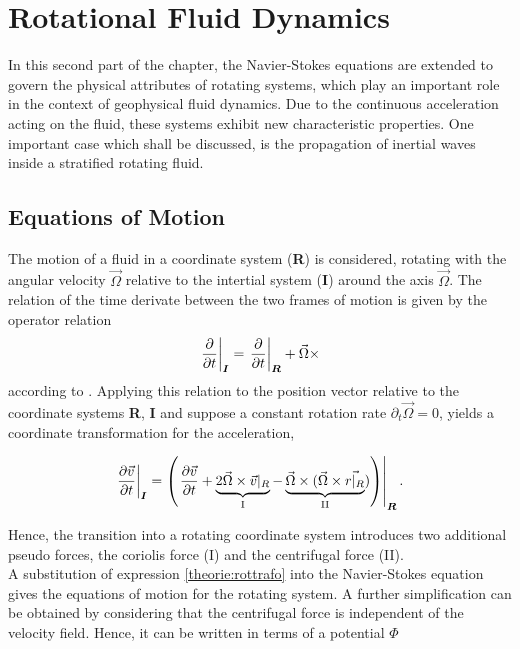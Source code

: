 \section{Rotational Fluid Dynamics}

In this second part of the chapter, the Navier-Stokes equations are extended to govern the physical attributes of rotating systems,
which play an important role in the context of geophysical fluid dynamics.
Due to the continuous acceleration acting on the fluid, these systems exhibit new characteristic properties.
One important case which shall be discussed, is the propagation of inertial waves inside a stratified rotating fluid.

\subsection{Equations of Motion}
\label{THEORIE:ROT}

The motion of a fluid in a coordinate system (\textbf{R}) is considered, rotating with the angular velocity $\vec{\Omega}$
relative to the intertial system (\textbf{I}) around the axis $\vec{\Omega}$.
The relation of the time derivate between the two frames of motion is given by the operator relation
\begin{align}
    \left.{\pdn[]{t}}\right|_{\bm{I}} = \left.\pdn[]{t}\right|_{\bm{R}} + \vec{\Omega} \times
\end{align}
according to \citep{Tilgner2007}.
Applying this relation to the position vector relative to the coordinate systems \textbf{R}, \textbf{I}
and suppose a constant rotation rate $\partial_t\vec{\Omega} = 0$, yields a coordinate transformation for the acceleration,

\begin{align}
    \label{theorie:rottrafo}
    \left.\pdn[\vec{v}]{t}\right|_{\bm{I}} = \left(\left.\pdn[\vec{v}]{t}  + \underbrace{2\vec{\Omega} \times \vec{v}|_R}_{\text{I}}
    - \underbrace{\vec{\Omega} \times (\vec{\Omega} \times \vec{r|_R}}_{\text{II}})\right)\right|_{\bm{R}}.
\end{align}

Hence, the transition into a rotating coordinate system introduces two additional pseudo forces, the coriolis force (I)  and the centrifugal force (II).\\
A substitution of expression \ref{theorie:rottrafo} into the Navier-Stokes equation gives the equations of motion for the rotating system.
A further simplification can be obtained by considering that the centrifugal force is independent of the velocity field.
Hence, it can be written in terms of a potential $\Phi$

